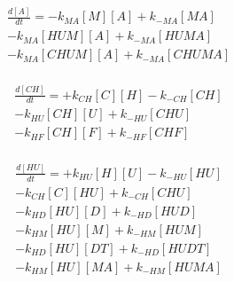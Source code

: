 \begin{equation}
\begin{split}
\frac{d[A]}{dt} =     - k_{MA}[M][A]    + k_{-MA}[MA]     \\%
                      - k_{MA}[HUM][A]  + k_{-MA}[HUMA]   \\%
                      - k_{MA}[CHUM][A] + k_{-MA}[CHUMA]  \\%
\end{split}
\end{equation}

\begin{equation}
\begin{split}
\frac{d[CH]}{dt} =    + k_{CH}[C][H]    - k_{-CH}[CH]     \\%
                      - k_{HU}[CH][U]   + k_{-HU}[CHU]    \\%
                      - k_{HF}[CH][F]   + k_{-HF}[CHF]    \\%
\end{split}
\end{equation}

\begin{equation}
\begin{split}
\frac{d[HU]}{dt} =    + k_{HU}[H][U]    - k_{-HU}[HU]     \\%
                      - k_{CH}[C][HU]   + k_{-CH}[CHU]    \\%
                      - k_{HD}[HU][D]   + k_{-HD}[HUD]    \\%
                      - k_{HM}[HU][M]   + k_{-HM}[HUM]    \\%
                      - k_{HD}[HU][DT]  + k_{-HD}[HUDT]   \\%
                      - k_{HM}[HU][MA]  + k_{-HM}[HUMA]   \\%
\end{split}
\end{equation}

